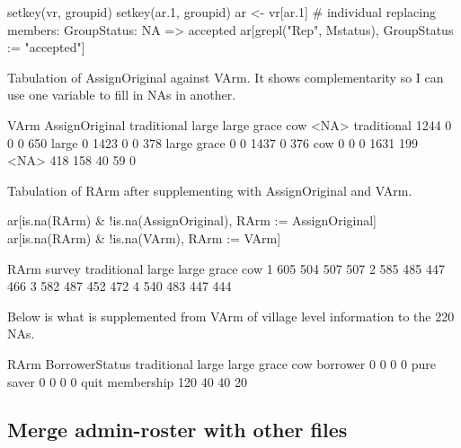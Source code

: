 \begin{Schunk}
\begin{Sinput}
setkey(vr, groupid)
setkey(ar.1, groupid)
ar <- vr[ar.1]
# individual replacing members: GroupStatus: NA => accepted
ar[grepl("Rep", Mstatus), GroupStatus := "accepted"]
\end{Sinput}
\end{Schunk}
Tabulation of \textsf{AssignOriginal} against \textsf{VArm}. It shows complementarity so I can use one variable to fill in NAs in another.
\begin{Schunk}
\begin{Soutput}
              VArm
AssignOriginal traditional large large grace  cow <NA>
   traditional        1244     0           0    0  650
   large                 0  1423           0    0  378
   large grace           0     0        1437    0  376
   cow                   0     0           0 1631  199
   <NA>                418   158          40   59    0
\end{Soutput}
\end{Schunk}
Tabulation of \textsf{RArm} after supplementing with \textsf{AssignOriginal} and \textsf{VArm}.
\begin{Schunk}
\begin{Sinput}
ar[is.na(RArm) & !is.na(AssignOriginal), RArm := AssignOriginal]
ar[is.na(RArm) & !is.na(VArm), RArm := VArm]
\end{Sinput}
\end{Schunk}
\begin{Schunk}
\begin{Soutput}
      RArm
survey traditional large large grace cow
     1         605   504         507 507
     2         585   485         447 466
     3         582   487         452 472
     4         540   483         447 444
\end{Soutput}
\end{Schunk}
Below is what is supplemented from \textsf{VArm} of village level information to the 220 NAs.
\begin{Schunk}
\begin{Soutput}
                 RArm
BorrowerStatus    traditional large large grace cow
  borrower                  0     0           0   0
  pure saver                0     0           0   0
  quit membership         120    40          40  20
\end{Soutput}
\end{Schunk}

\subsection{Merge admin-roster with other files}

